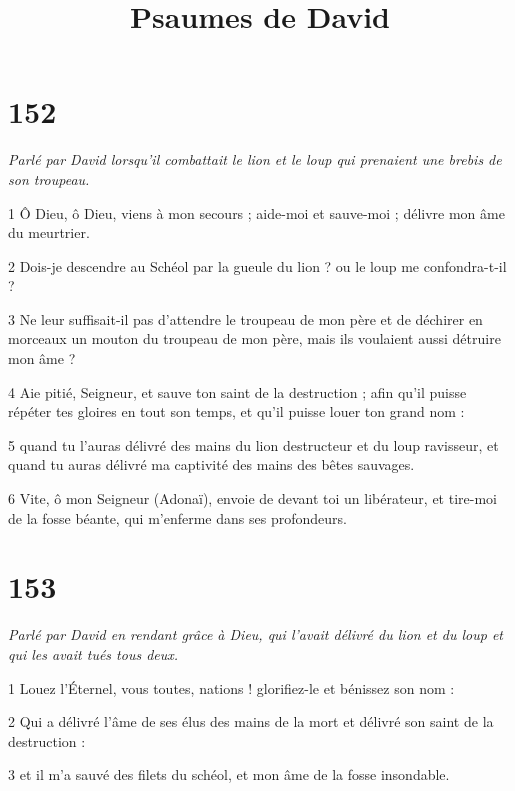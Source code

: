 

\title{Psaumes de David}

\chapter{152}

\par \textit{Parlé par David lorsqu'il combattait le lion et le loup qui prenaient une brebis de son troupeau.}

\par 1 Ô Dieu, ô Dieu, viens à mon secours ; aide-moi et sauve-moi ; délivre mon âme du meurtrier.

\par 2 Dois-je descendre au Schéol par la gueule du lion ? ou le loup me confondra-t-il ?

\par 3 Ne leur suffisait-il pas d'attendre le troupeau de mon père et de déchirer en morceaux un mouton du troupeau de mon père, mais ils voulaient aussi détruire mon âme ?

\par 4 Aie pitié, Seigneur, et sauve ton saint de la destruction ; afin qu'il puisse répéter tes gloires en tout son temps, et qu'il puisse louer ton grand nom :

\par 5 quand tu l'auras délivré des mains du lion destructeur et du loup ravisseur, et quand tu auras délivré ma captivité des mains des bêtes sauvages.

\par 6 Vite, ô mon Seigneur (Adonaï), envoie de devant toi un libérateur, et tire-moi de la fosse béante, qui m'enferme dans ses profondeurs.

\chapter{153}

\par \textit{Parlé par David en rendant grâce à Dieu, qui l'avait délivré du lion et du loup et qui les avait tués tous deux.}

\par 1 Louez l'Éternel, vous toutes, nations ! glorifiez-le et bénissez son nom :

\par 2 Qui a délivré l'âme de ses élus des mains de la mort et délivré son saint de la destruction :

\par 3 et il m'a sauvé des filets du schéol, et mon âme de la fosse insondable.

